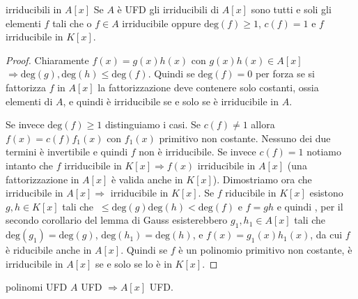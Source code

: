 \begin{theorem}{irriducibili in $A[x]$}
    Se $A$ è UFD gli irriducibili di $A[x]$ sono tutti e soli gli elementi $f$ tali che o $f \in A$ irriducibile oppure $\text{deg}(f) \geq 1$, $c(f) = 1$ e $f$ irriducibile in $K[x]$.
\end{theorem}
\begin{proof}
    Chiaramente $f(x) = g(x)h(x)$ con $g(x)h(x) \in A[x]$ $\Rightarrow \text{deg}(g),\text{deg}(h) \leq \text{deg}(f)$.
    Quindi se $\text{deg}(f) = 0$ per forza se si fattorizza $f$ in $A[x]$ la fattorizzazione deve contenere solo costanti, ossia elementi di $A$, e quindi è irriducibile se e solo se è irriducibile in $A$.
    
    Se invece $\text{deg}(f) \geq 1$ distinguiamo i casi. Se $c(f) \neq 1$ allora $f(x) = c(f)f_1(x)$ con $f_1(x)$ primitivo non costante. Nessuno dei due termini è invertibile e quindi $f$ non è irriducibile. Se invece $c(f) = 1$ notiamo intanto che $f$ irriducibile in $K[x] \Rightarrow f(x)$ irriducibile in $A[x]$ (una fattorizzazione in $A[x]$ è valida anche in $K[x]$). Dimostriamo ora che irriducibile in $A[x] \Rightarrow$ irriducibile in $K[x]$. Se $f$ riducibile in $K[x]$ esistono $g,h \in K[x]$ tali che $\ \leq \text{deg}(g)\text{deg}(h) < \text{deg}(f)$ e $f = gh$ e quindi , per il secondo corollario del lemma di Gauss esisterebbero $g_1,h_1 \in A[x]$ tali che $\text{deg}(g_1) = \text{deg}(g)$, $\text{deg}(h_1) = \text{deg}(h)$, e $f(x) = g_1(x)h_1(x)$, da cui $f$ è riducibile anche in $A[x]$. Quindi se $f$ è un polinomio primitivo non costante, è irriducibile in $A[x]$ se e solo se lo è in $K[x]$. 
\end{proof}
\begin{theorem}{polinomi UFD}
    $A$ UFD $\Rightarrow A[x]$ UFD.
\end{theorem}
